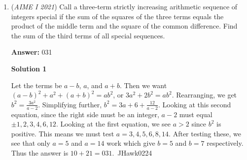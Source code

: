 \begin{enumerate}
 For example $63$ has 1 choice,$63-2$ has 2 choices, $63-4$ has $3$ choices.

 This pattern will continue until the maximum number of choices for how to arrange the coins in the remaining piles is reached at $33$. This occurs at $33$ because, for any pile size greater than $33$, the two remaining piles must sum to less than $33$, and for any pile size less than $33$, there are tighter restrictions because $x+y$ must be greater than $33$, but $x$ must be less than $y$.

 The smallest possible pile size for $x$ will be $23$, with one choice.

 We know the number of ways all the way up until a pile size of $33$, which will have $16$ ways: $(1+1+2+2+3+3+4+4...+16)=256$.

 We now just have to sum the number of ways for $x-sizes$ from $23-32$. We list out the number of ways, and there is a pattern as well. We alternate by adding $1$ way and $2$ ways with each increase in pile size. So we add $1+2+4+5+7+8+10+11+13+14$ to $256$ which gives $\boxed{331}$.

 
            \begin{itemize}
        \item <ul><li class="mw-empty-elt"></li></ul>
            \end{itemize}
            


	\item (\textit{AIME I 2021}) Call a three-term strictly increasing arithmetic sequence of integers special if the sum of the squares of the three terms equals the product of the middle term and the square of the common difference. Find the sum of the third terms of all special sequences.


 
 \textbf{Answer: }031



\textbf{Solution 1}

Let the terms be $a-b$, $a$, and $a+b$. Then we want $(a-b)^2+a^2+(a+b)^2=ab^2$, or $3a^2+2b^2=ab^2$. Rearranging, we get $b^2=\frac{3a^2}{a-2}$. Simplifying further, $b^2=3a+6+\frac{12}{a-2}$. Looking at this second equation, since the right side must be an integer, $a-2$ must equal $\pm1, 2, 3, 4, 6, 12$. Looking at the first equation, we see $a>2$ since $b^2$ is positive. This means we must test $a=3, 4, 5, 6, 8, 14$. After testing these, we see that only $a=5$ and $a=14$ work which give $b=5$ and $b=7$ respectively. Thus the answer is $10+21=\boxed{031}$.~JHawk0224


\end{enumerate}
